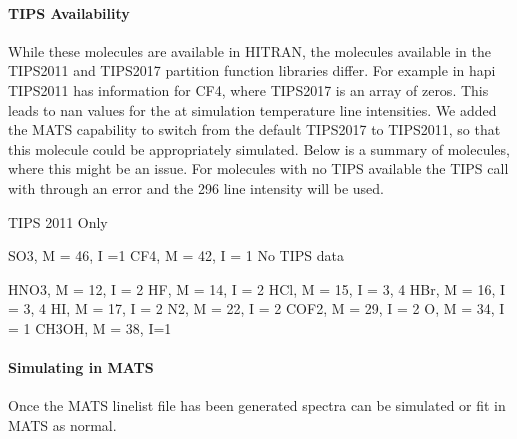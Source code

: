 \documentclass[letterpaper,10pt,english]{sphinxmanual}
\begin{document}
\paragraph{TIPS Availability}
\label{\detokenize{HITRAN Line-by-Line Static Molecules:tips-availability}}
\sphinxAtStartPar
While these molecules are available in HITRAN, the molecules available in the TIPS\sphinxhyphen{}2011 and TIPS\sphinxhyphen{}2017 partition function libraries differ. For example in hapi TIPS\sphinxhyphen{}2011 has information for CF4, where TIPS\sphinxhyphen{}2017 is an array of zeros. This leads to nan values for the at simulation temperature line intensities. We added the MATS capability to switch from the default TIPS\sphinxhyphen{}2017 to TIPS\sphinxhyphen{}2011, so that this molecule could be appropriately simulated. Below is a summary of molecules, where this might be an issue. For molecules with no TIPS available the TIPS call with through an error and the 296 line intensity will be used.

\sphinxAtStartPar
TIPS 2011 Only

\sphinxAtStartPar
SO3, M = 46, I =1
CF4, M = 42, I = 1
No TIPS data

\sphinxAtStartPar
HNO3, M = 12, I = 2
HF, M = 14, I = 2
HCl, M = 15, I = 3, 4
HBr, M = 16, I = 3, 4
HI, M = 17, I = 2
N2, M = 22, I = 2
COF2, M = 29, I = 2
O, M = 34, I = 1
CH3OH, M = 38, I=1


\paragraph{Simulating in MATS}
\label{\detokenize{HITRAN Line-by-Line Static Molecules:simulating-in-mats}}
\sphinxAtStartPar
Once the MATS linelist file has been generated spectra can be simulated or fit in MATS as normal.
\end{document}
